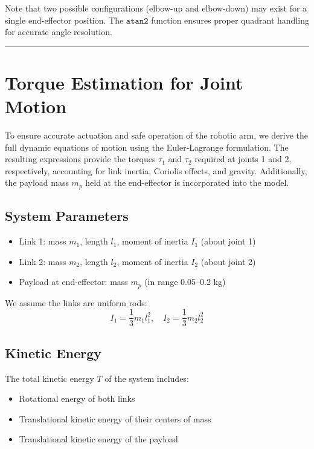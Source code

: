 \documentclass[a4paper,12pt]{article}
\begin{document}
Note that two possible configurations (elbow-up and elbow-down) may exist for a single end-effector position. The $\texttt{atan2}$ function ensures proper quadrant handling for accurate angle resolution.

\vspace{1em}
\noindent\rule{\linewidth}{0.6pt}
\vspace{1em}
\section{Torque Estimation for Joint Motion} \label{sec:torque}

To ensure accurate actuation and safe operation of the robotic arm, we derive the full dynamic equations of motion using the Euler-Lagrange formulation. The resulting expressions provide the torques $\tau_1$ and $\tau_2$ required at joints 1 and 2, respectively, accounting for link inertia, Coriolis effects, and gravity. Additionally, the payload mass $m_p$ held at the end-effector is incorporated into the model.

\subsection*{System Parameters}
\begin{itemize}
    \item Link 1: mass $m_1$, length $l_1$, moment of inertia $I_1$ (about joint 1)
    \item Link 2: mass $m_2$, length $l_2$, moment of inertia $I_2$ (about joint 2)
    \item Payload at end-effector: mass $m_p$ (in range 0.05–0.2 kg)
\end{itemize}

We assume the links are uniform rods:
\[
I_1 = \frac{1}{3} m_1 l_1^2, \quad I_2 = \frac{1}{3} m_2 l_2^2
\]

\subsection*{Kinetic Energy}

The total kinetic energy $T$ of the system includes:
\begin{itemize}
    \item Rotational energy of both links
    \item Translational kinetic energy of their centers of mass
    \item Translational kinetic energy of the payload
\end{itemize}
\end{document}
